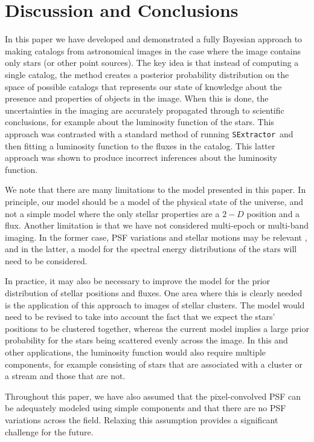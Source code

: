 \documentclass[manuscript]{aastex}
\newcommand{\sex}{{\tt SExtractor}}
\begin{document}
\section{Discussion and Conclusions}\label{sec:conclusion}

In this paper we have developed and demonstrated a fully Bayesian approach to
making catalogs from astronomical images in the case where the image contains
only stars (or other point sources). The key idea is that instead of computing
a single catalog, the method creates a posterior probability distribution on
the space of possible catalogs that represents our state of knowledge about
the presence and properties of objects in the image. When this is done, the
uncertainties in the imaging are accurately propagated through to scientific
conclusions, for example about the luminosity function of the stars.
This approach was contrasted with a standard method of running \sex~and then
fitting a luminosity function to the fluxes in the catalog. This latter approach
was shown to produce incorrect inferences about the luminosity function.

We note that there are many limitations to the model presented in this paper.
In principle, our model should be a model of the physical state of the universe,
and not a simple model where the only stellar properties are a $2-D$ position and
a flux. Another limitation is that we have not considered multi-epoch or multi-band
imaging. In the former case, PSF variations and stellar motions may be relevant
\citep{lang}, and in the latter, a model for the spectral energy distributions
of the stars will need to be considered.

In practice, it may also be necessary to improve the model for the prior
distribution
of stellar positions and fluxes. One area where this is clearly needed is the
application of this approach to images of stellar clusters. The model would need
to be revised to take into account the fact that we expect the stars' positions
to be clustered together, whereas the current model implies a large prior
probability for the stars being scattered evenly across the image. In this and
other applications, the luminosity function would also require multiple
components, for example consisting of stars that are associated with a cluster
or a stream and those that are not.

Throughout this paper, we have also assumed that the pixel-convolved PSF can
be adequately modeled using simple components and that there are no PSF
variations across the field. Relaxing this assumption provides a significant
challenge for the future.
\end{document}
